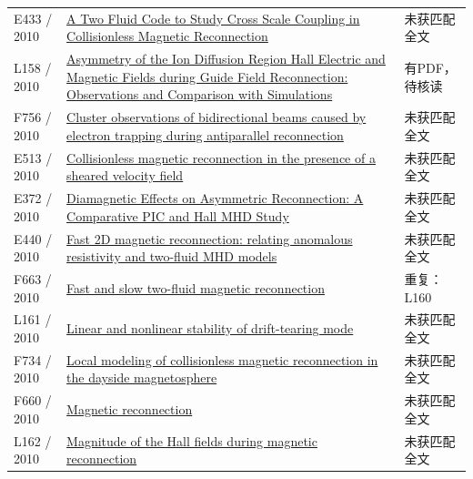 \begin{longtable}{P{24mm}P{97mm}P{27mm}}
E433 / 2010 & \href{http://ui.adsabs.harvard.edu/abs/2010AGUFMSM51B1813J/abstract}{A Two Fluid Code to Study Cross Scale Coupling in Collisionless Magnetic Reconnection} & 未获匹配全文\\

L158 / 2010 & \href{https://doi.org/10.1103/physrevlett.104.205001}{Asymmetry of the Ion Diffusion Region Hall Electric and Magnetic Fields during Guide Field Reconnection: Observations and Comparison with Simulations} & 有PDF，待核读\\

F756 / 2010 & \href{https://doi.org/10.1029/2009ja014650}{Cluster observations of bidirectional beams caused by electron trapping during antiparallel reconnection} & 未获匹配全文\\

E513 / 2010 & \href{https://doi.org/10.1063/1.3430640}{Collisionless magnetic reconnection in the presence of a sheared velocity field} & 未获匹配全文\\

E372 / 2010 & \href{http://absimage.aps.org/image/DPP10/MWS_DPP10-2010-001669.pdf}{Diamagnetic Effects on Asymmetric Reconnection: A Comparative PIC and Hall MHD Study} & 未获匹配全文\\

E440 / 2010 & \href{http://absimage.aps.org/image/DPP10/MWS_DPP10-2010-000576.pdf}{Fast 2D magnetic reconnection: relating anomalous resistivity and two-fluid MHD models} & 未获匹配全文\\

F663 / 2010 & \href{https://doi.org/10.48550/arxiv.1005.3760}{Fast and slow two-fluid magnetic reconnection} & 重复：L160\\

L161 / 2010 & \href{https://doi.org/10.1088/0029-5515/50/2/025014}{Linear and nonlinear stability of drift-tearing mode} & 未获匹配全文\\

F734 / 2010 & \href{https://doi.org/10.1080/10420150903516569}{Local modeling of collisionless magnetic reconnection in the dayside magnetosphere} & 未获匹配全文\\

F660 / 2010 & \href{https://doi.org/10.1103/revmodphys.82.603}{Magnetic reconnection} & 未获匹配全文\\

L162 / 2010 & \href{https://doi.org/10.1029/2009gl041941}{Magnitude of the Hall fields during magnetic reconnection} & 未获匹配全文\\


\end{longtable}
